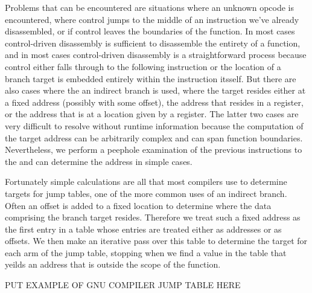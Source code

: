 Problems that can be encountered are situations where an unknown opcode is encountered, where control jumps to the
middle of an instruction we've already disassembled, or if control leaves the boundaries of the function. In most
cases control-driven disassembly is sufficient to disassemble the entirety of a function, and in most cases control-driven
disassembly is a straightforward process because control either falls through to the following instruction 
or the location of a branch target is embedded entirely within the instruction itsself. But there are also cases
where the an indirect branch is used, where the target resides either at a fixed address (possibly with some offset), the address that resides in a register,
or the address that is at a location given by a register. The latter two cases are very difficult to resolve
without runtime information because the computation of the target address can be arbitrarily complex and can span function
boundaries. Nevertheless, we perform a peephole examination of the previous instructions to the and can determine 
the address in simple cases.

Fortunately simple calculations are all that most compilers use to determine targets for jump tables, one of the more common
uses of an indirect branch. Often an offset is added to a fixed location to determine where the data comprising the branch target
resides. Therefore we treat such a fixed address as the first entry in a table whose entries are treated either as addresses or as offsets.
We then make an iterative pass over this table to determine the target for each arm of the jump table, stopping when we find a value in the
table that yeilds an address that is outside the scope of the function.

PUT EXAMPLE OF GNU COMPILER JUMP TABLE HERE

